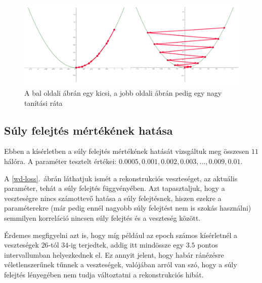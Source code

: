 \begin{figure}[h!]
  
  
	\begin{center}
	\includegraphics[width=1\linewidth]{parabolas.png}
	\end{center}
	
  \caption{A bal oldali ábrán egy kicsi, a jobb oldali ábrán pedig egy nagy tanítási ráta}\label{para}
\end{figure}



\subsection{Súly felejtés mértékének hatása}

Ebben a kísérletben a súly felejtés mértékének hatását vizsgáltuk meg összesen $11$ hálóra. A paraméter tesztelt értékei: $0.0005, 0.001, 0.002, 0.003, \dots , 0.009, 0.01$.

A \ref{wd-loss}.~ábrán láthatjuk ismét a rekonstrukciós veszteséget, az aktuális paraméter, tehát a súly felejtés függvényében. Azt tapasztaljuk, hogy a veszteségre nincs számottevő hatása a súly felejtésnek, hiszen ezekre a paraméterekre (már pedig ennél nagyobb súly felejtést nem is szokás használni) semmilyen korreláció nincsen súly felejtés és a veszteség között. 

Érdemes megfigyelni azt is, hogy míg például az epoch számos kísérletnél a veszteségek $26$-tól $34$-ig terjedtek, addig itt mindössze egy $3.5$ pontos intervallumban helyezkednek el. Ez annyit jelent, hogy habár ránézésre véletlenszerűnek tűnnek a veszteségek, valójában arról van szó, hogy a súly felejtés lényegében nem tudja változtatni a rekonstrukciós hibát.



